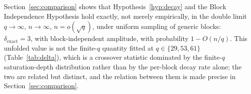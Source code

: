     \begin{remark}
      \label{rem:hyp-resolved}
      Section~\ref{sec:comparison} shows that Hypothesis~\ref{hyp:decay} and the Block
      Independence Hypothesis hold exactly, not merely empirically, in the double limit
      $q\to\infty$, $n\to\infty$, $n=o(\sqrt{q})$, under uniform sampling of generic blocks:
      $\delta_{\mathrm{exact}}=3$, with block-independent amplitude, with probability
      $1-O(n/q)$.
      This unfolded value is not the finite-$q$ quantity fitted at $q\in\{29,53,61\}$
      (Table~\ref{tab:delta}), which is a crossover statistic dominated by the finite-$q$
      saturation-depth distribution rather than by the per-block decay rate alone; the two
      are related but distinct, and the relation between them is made precise in
      Section~\ref{sec:comparison}.
    \end{remark}
